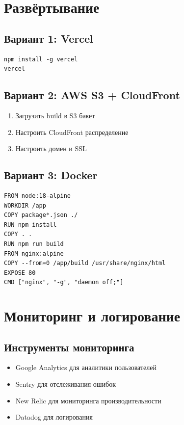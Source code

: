 \documentclass[12pt,a4paper]{report}
\begin{document}
\section{Развёртывание}

\subsection{Вариант 1: Vercel}
\begin{lstlisting}
npm install -g vercel
vercel
\end{lstlisting}

\subsection{Вариант 2: AWS S3 + CloudFront}
\begin{enumerate}
    \item Загрузить build в S3 бакет
    \item Настроить CloudFront распределение
    \item Настроить домен и SSL
\end{enumerate}

\subsection{Вариант 3: Docker}
\begin{lstlisting}
FROM node:18-alpine
WORKDIR /app
COPY package*.json ./
RUN npm install
COPY . .
RUN npm run build
FROM nginx:alpine
COPY --from=0 /app/build /usr/share/nginx/html
EXPOSE 80
CMD ["nginx", "-g", "daemon off;"]
\end{lstlisting}

\section{Мониторинг и логирование}

\subsection{Инструменты мониторинга}
\begin{itemize}
    \item Google Analytics для аналитики пользователей
    \item Sentry для отслеживания ошибок
    \item New Relic для мониторинга производительности
    \item Datadog для логирования
\end{itemize}
\end{document}
